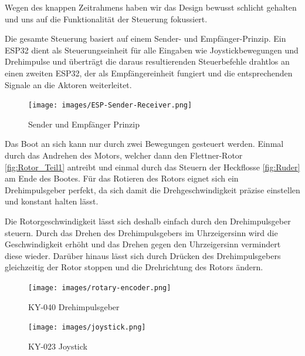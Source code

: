 \documentclass[a4paper,12pt]{article}
\begin{document}
Wegen des knappen Zeitrahmens haben wir das Design bewusst schlicht gehalten und uns auf die Funktionalität der Steuerung fokussiert. \newline











Die gesamte Steuerung basiert auf einem Sender- und Empfänger-Prinzip. Ein ESP32 dient als Steuerungseinheit für alle Eingaben wie Joystickbewegungen und Drehimpulse und überträgt die daraus resultierenden Steuerbefehle drahtlos an einen zweiten ESP32, der als Empfängereinheit fungiert und die entsprechenden Signale an die Aktoren weiterleitet.
\begin{figure}[H]
    \centering
    \texttt{[image: images/ESP-Sender-Receiver.png]}
    \caption{Sender und Empfänger Prinzip}
    \label{fig:sender-receiver}
\end{figure}
Das Boot an sich kann nur durch zwei Bewegungen gesteuert werden. Einmal durch das Andrehen des Motors, welcher dann den Flettner-Rotor \ref{fig:Rotor_Teil1} antreibt und einmal durch das Steuern der Heckflosse \ref{fig:Ruder} am Ende des Bootes. Für das Rotieren des Rotors eignet sich ein Drehimpulsgeber perfekt, da sich damit die Drehgeschwindigkeit präzise einstellen und konstant halten lässt. 


Die Rotorgeschwindigkeit lässt sich deshalb einfach durch den Drehimpulsgeber steuern. Durch das Drehen des Drehimpulsgebers im Uhrzeigersinn wird die Geschwindigkeit erhöht und das Drehen gegen den Uhrzeigersinn vermindert diese wieder. Darüber hinaus lässt sich durch Drücken des Drehimpulsgebers gleichzeitig der Rotor stoppen und die Drehrichtung des Rotors ändern.
\begin{figure}[H]
    \centering
    \begin{minipage}[b]{0.45\linewidth}
        \centering
        \texttt{[image: images/rotary-encoder.png]}
        \caption{KY-040 Drehimpulsgeber}
        \label{fig:rotary-encoder}
    \end{minipage}
    \hspace{1.2em}
    \begin{minipage}[b]{0.4\linewidth}
        \centering
        \texttt{[image: images/joystick.png]}
        \caption{KY-023 Joystick}
        \label{fig:joystick}
    \end{minipage}
\end{figure}
\end{document}
